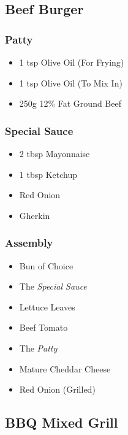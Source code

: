 \documentclass[11pt, english]{article}
\begin{document}
\newpage

	\subsection{Beef Burger}

		\subsubsection*{Patty}

	\begin{itemize}
        \setlength\itemsep{0cm}
		\item 1 tsp Olive Oil (For Frying)
		\item 1 tsp Olive Oil (To Mix In)
		\item 250g 12\% Fat Ground Beef
        \end{itemize}

		\subsubsection*{Special Sauce}

	\begin{itemize}
        \setlength\itemsep{0cm}
		\item 2 tbsp Mayonnaise
		\item 1 tbsp Ketchup
		\item Red Onion
		\item Gherkin
        \end{itemize}

		\subsubsection*{Assembly}

	\begin{itemize}
        \setlength\itemsep{0cm}
		\item Bun of Choice
		\item The \textit{Special Sauce}
		\item Lettuce Leaves
		\item Beef Tomato
		\item The \textit{Patty}
		\item Mature Cheddar Cheese
		\item Red Onion (Grilled)
        \end{itemize}

\newpage

	\subsection{BBQ Mixed Grill}
\end{document}
